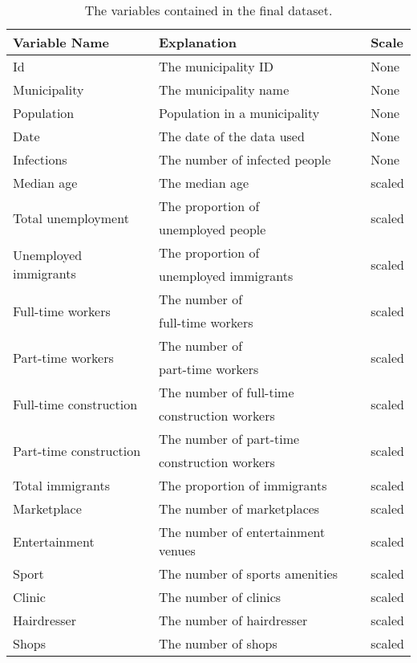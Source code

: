 \begin{table}[H] 
\caption{The variables contained in the final dataset.\label{datasetNorway}}
\begin{tabular}{l l l}
\toprule
\textbf{Variable Name}	& \textbf{Explanation}	& \textbf{Scale}\\
\midrule
Id & The municipality ID & None \\
Municipality & The municipality name & None \\
Population & Population in a municipality & None \\
Date & The date of the data used & None \\
Infections & The number of infected people & None \\
Median age & The median age & scaled \\
\multirow{2}{*}{Total unemployment} & The proportion of &\multirow{2}{*}{scaled}\\
& unemployed people \\
\multirow{2}{*}{Unemployed immigrants} & The proportion of & \multirow{2}{*}{scaled}\\
 & unemployed immigrants  \\
\multirow{2}{*}{Full-time workers} & The number of & \multirow{2}{*}{scaled} \\
& full-time workers \\
\multirow{2}{*}{Part-time workers} & The number of & \multirow{2}{*}{scaled} \\
& part-time workers \\
\multirow{2}{*}{Full-time construction} & The number of full-time & \multirow{2}{*}{scaled} \\
& construction workers \\
\multirow{2}{*}{Part-time construction} & The number of part-time & \multirow{2}{*}{scaled} \\
& construction workers \\
Total immigrants & The proportion of immigrants  & scaled \\
Marketplace & The number of marketplaces & scaled \\
Entertainment & The number of entertainment venues & scaled \\
Sport & The number of sports amenities & scaled \\
Clinic & The number of clinics & scaled \\
Hairdresser & The number of hairdresser & scaled \\
Shops & The number of shops & scaled \\

\end{tabular}
\end{table}
